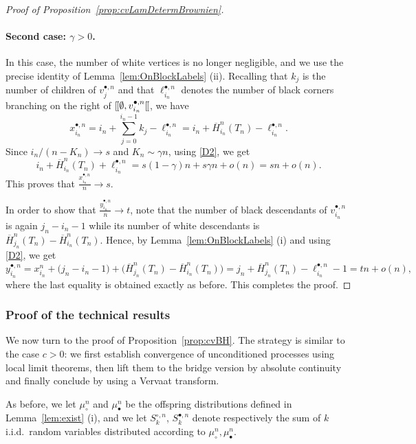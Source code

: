 \documentclass[AHL,XML,longabstracts,Unicode]{cedram}
\def\mubn{\mu_{\bullet}^{n}}
\def\mucn{\mu_{\circ}^{n}}
\def\Sbn{S^{\bullet,n}}
\def\Scn{S^{\circ,n}}
\def\oH{\overline{H}}
\def\llbracket{[\hspace{-.10em} [ }
\begin{document}
\begin{proof}[Proof of Proposition~\ref{prop:cvLamDetermBrownien}]
\paragraph*{Second case: $\gamma>0$.} In this case, the number of white vertices is no longer negligible, and we use the precise identity of   Lemma~\ref{lem:OnBlockLabels} (ii). Recalling that $k_j$ is the number of children of $v^{\bullet,n}_j$
and that $\ell_{i_{n}}^{\bullet,n}$ denotes the number of black corners
branching on the right of  $\llbracket \emptyset, v^{\bullet,n}_{i_{n}} \llbracket$,
we have
 \begin{equation}
 \label{eq:est1}x^{\bullet,n}_{i_{n}}= i_{n}+\sum_{j=0}^{i_{n}-1} k_{j} - \ell_{i_{n}}^{\bullet,n}=i_{n}+\oH^{n}_{i_{n}}(T_{n})- \ell_{i_{n}}^{\bullet,n}.
 \end{equation}
Since $i_{n}/(n-K_{n}) \rightarrow s$ and $K_{n} \sim \gamma n$,  using \ref{D2}, we get
\begin{equation}
\label{eq:est2}i_{n}+ \oH^{n}_{i_{n}}(T_{n})+ \ell_{i_{n}}^{\bullet,n}=  s(1-\gamma) n + s \gamma n + o(n)=sn+o(n).
\end{equation}
This proves that $\tfrac{x^{\bullet,n}_{i_{n}}}{n} \rightarrow s$.

 In order to show that $\tfrac{y ^{\bullet,n}_{i_{n}}}{n} \rightarrow t$, note that the number of black descendants of $v^{\bullet,n}_{i_{n}}$ is again $j_{n}-i_{n}-1$ while its number of white descendants is $\oH^{n}_{j_{n}}(T_{n})-\oH^{n}_{i_{n}}(T_{n})$. Hence, by Lemma~\ref{lem:OnBlockLabels} (i) and using \ref{D2}, we get
 \[y ^{\bullet,n}_{i_{n}}=x ^{n}_{i_{n}}+\big(j_{n}-i_{n}-1\big)+\big(\oH^{n}_{j_{n}}(T_{n})-\oH^{n}_{i_{n}}(T_{n})\big)=j_{n}+\oH^{n}_{j_{n}}(T_{n})- \ell_{i_{n}}^{\bullet,n}-1= tn+o(n),\]
where the last equality is obtained exactly as before. This completes the proof.
\end{proof}


\subsubsection{Proof of the technical results}
\label{ssec:technical}

We now turn to the proof of Proposition~\ref{prop:cvBH}.
The strategy is similar to the case $c>0$: we first establish convergence of unconditioned processes using local limit theorems, then lift them to the bridge version by absolute continuity and finally conclude by using a Vervaat transform.

 As before, we let
$\mucn$ and $\mubn$ be the offspring distributions defined in Lemma~\ref{lem:exist} (i), and we let $\Scn_{k}$, $\Sbn_{k}$ denote respectively the sum of $k$ i.i.d.~random variables distributed according to $\mucn,\mubn$.
\end{document}
